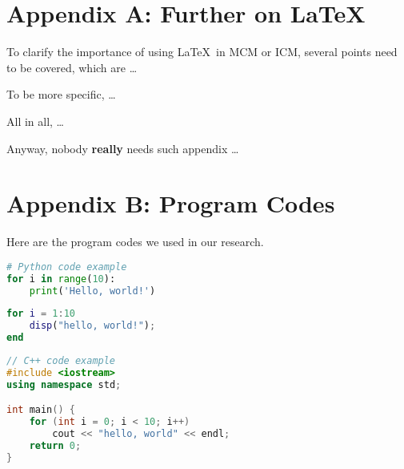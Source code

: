 \documentclass[12pt]{article}  %
\begin{document}
\begin{subappendices}  %

\section{Appendix A: Further on \LaTeX}
To clarify the importance of using \LaTeX\ in MCM or ICM, several points need to be covered, which are \ldots

To be more specific, \ldots

All in all, \ldots

Anyway, nobody \textbf{really} needs such appendix \ldots

\section{Appendix B: Program Codes}
Here are the program codes we used in our research.


\begin{lstlisting}[language=Python, name={test.py}]
# Python code example
for i in range(10):
    print('Hello, world!')
\end{lstlisting}

\begin{lstlisting}[language=MATLAB, name={test.m}]
% MATLAB code example
for i = 1:10
    disp("hello, world!");
end
\end{lstlisting}

\begin{lstlisting}[language=C++, name={test.cpp}]
// C++ code example
#include <iostream>
using namespace std;

int main() {
    for (int i = 0; i < 10; i++)
        cout << "hello, world" << endl;
    return 0;
}
\end{lstlisting}

\end{subappendices}  %
\end{document}
